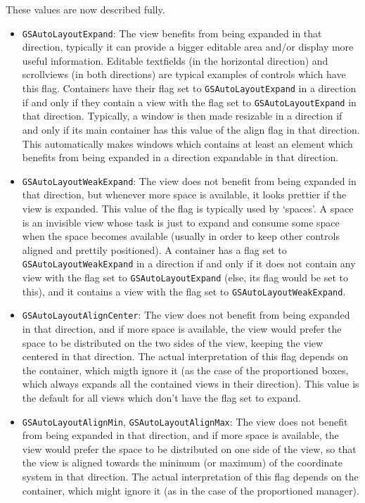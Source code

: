 These values are now described fully.
\begin{itemize}

\item \texttt{GSAutoLayoutExpand}: The view benefits from being expanded
in that direction, typically it can provide a bigger editable area
and/or display more useful information.  Editable textfields (in the
horizontal direction) and scrollviews (in both directions) are typical
examples of controls which have this flag.  Containers have their flag
set to \texttt{GSAutoLayoutExpand} in a direction if and only if they
contain a view with the flag set to \texttt{GSAutoLayoutExpand} in
that direction.  Typically, a window is then made resizable in a
direction if and only if its main container has this value of the
align flag in that direction.  This automatically makes windows which
contains at least an element which benefits from being expanded in a
direction expandable in that direction.

\item \texttt{GSAutoLayoutWeakExpand}:  The view does not benefit from being
expanded in that direction, but whenever more space is available, it
looks prettier if the view is expanded.  This value of the flag is
typically used by `spaces'.  A space is an invisible view whose task
is just to expand and consume some space when the space becomes
available (usually in order to keep other controls aligned and
prettily positioned).  A container has a flag set to
\texttt{GSAutoLayoutWeakExpand} in a direction if and only if it does 
not contain any view with the flag set to \texttt{GSAutoLayoutExpand}
(else, its flag would be set to this), and it contains a view with the
flag set to \texttt{GSAutoLayoutWeakExpand}.

\item \texttt{GSAutoLayoutAlignCenter}: The view does not benefit from being
expanded in that direction, and if more space is available, the view
would prefer the space to be distributed on the two sides of the view,
keeping the view centered in that direction.  The actual
interpretation of this flag depends on the container, which migth
ignore it (as the case of the proportioned boxes, which always expands
all the contained views in their direction).  This value is the
default for all views which don't have the flag set to expand.

\item \texttt{GSAutoLayoutAlignMin}, \texttt{GSAutoLayoutAlignMax}: The view
does not benefit from being expanded in that direction, and if more
space is available, the view would prefer the space to be distributed
on one side of the view, so that the view is aligned towards the
minimum (or maximum) of the coordinate system in that direction.  The
actual interpretation of this flag depends on the container, which
might ignore it (as in the case of the proportioned manager).

\end{itemize}

